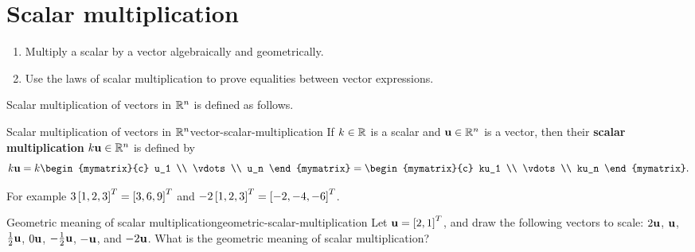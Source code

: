 \section{Scalar multiplication}

\begin{outcome}
  \begin{enumerate}
  \item Multiply a scalar by a vector algebraically and geometrically.
  \item Use the laws of scalar multiplication to prove equalities
    between vector expressions.
  \end{enumerate}
\end{outcome}

Scalar multiplication of vectors in $\mathbb{R}^n$ is defined as
follows.

\begin{definition}{Scalar multiplication of vectors in $\mathbb{R}^n$}{vector-scalar-multiplication}
  If $k\in\mathbb{R}$ is a scalar and $\vect{u}\in \R^n$ is a vector, then
  their \textbf{scalar multiplication}%
   $k\vect{u}\in \R^n$ is
  defined by
  \begin{equation*}
    k\vect{u}=k\begin{mymatrix}{c}
      u_1 \\
      \vdots \\
      u_n
    \end{mymatrix} = \begin{mymatrix}{c}
      ku_1 \\
      \vdots \\
      ku_n
    \end{mymatrix}.
  \end{equation*}
\end{definition}

For example $3 \left[1, 2, 3\right]^T = \left[3, 6, 9\right]^T$ and
$-2\left[1, 2, 3\right]^T = \left[-2, -4, -6\right]^T$.

\begin{example}{Geometric meaning of scalar multiplication}{geometric-scalar-multiplication}
  Let $\vect{u}=\mat{2,1}^T$, and draw the following vectors to scale:
  $2\vect{u}$, $\vect{u}$, $\frac{1}{2}\vect{u}$, $0\vect{u}$,
  $-\frac{1}{2}\vect{u}$, $-\vect{u}$, and $-2\vect{u}$.  What is the
  geometric meaning of scalar multiplication?
\end{example}

